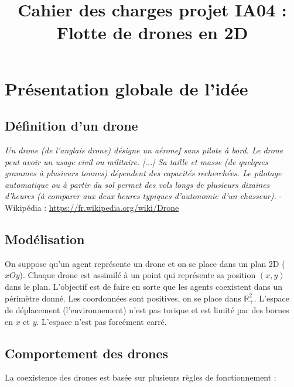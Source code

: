 \documentclass[11pt]{report}
\begin{document}
\setcounter{secnumdepth}{3}
\setcounter{tocdepth}{3}
\title{Cahier des charges projet IA04 : Flotte de drones en 2D}
\date{}
\renewcommand{\thesection}{\arabic{section}}
\maketitle
\renewcommand{\contentsname}{\centering Sommaire}
\tableofcontents

\newpage
\section{\textbf{Présentation globale de l'idée}}
\subsection{Définition d'un drone}

\textit{Un drone (de l'anglais drone) désigne un aéronef sans pilote à bord. Le drone peut avoir un usage civil ou militaire. [...] Sa taille et masse (de quelques grammes à plusieurs tonnes) dépendent des capacités recherchées. Le pilotage automatique ou à partir du sol permet des vols longs de plusieurs dizaines d'heures (à comparer aux deux heures typiques d'autonomie d'un chasseur).} - Wikipédia :  \textcolor{blue}{\url{https://fr.wikipedia.org/wiki/Drone}}

\subsection{Modélisation}

On suppose qu'un agent représente un drone et on se place dans un plan 2D ($xOy$). Chaque drone est assimilé à un point qui représente sa position $(x, y)$ dans le plan. L'objectif est de faire en sorte que les agents coexistent dans un périmètre donné. Les coordonnées sont positives, on se place dans $\mathbb{R}^{2}_{+}$. L'espace de déplacement (l'environnement) n'est pas torique et est limité par des bornes en $x$ et $y$. L'espace n'est pas forcément carré.

\subsection{Comportement des drones}

La coexistence des drones est basée sur plusieurs règles de fonctionnement : 
\end{document}
